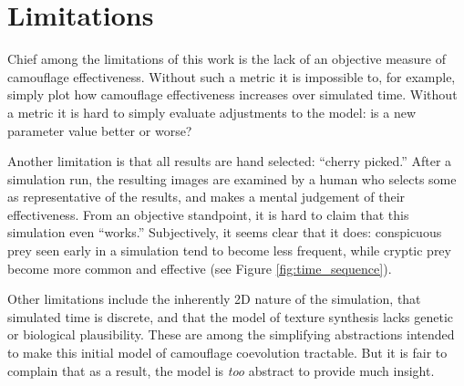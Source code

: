 \documentclass[acmtog]{acmart}
\begin{document}

\section{Limitations}
\label{subsec:limitations}
Chief among the limitations of this work is the lack of an objective measure of camouflage effectiveness. Without such a metric it is impossible to, for example, simply plot how camouflage effectiveness increases over simulated time. Without a metric it is hard to simply evaluate adjustments to the model: is a new parameter value better or worse?
\par
Another limitation is that all results are hand selected: “cherry picked.” After a simulation run, the resulting images are examined by a human who selects some as representative of the results, and makes a mental judgement of their effectiveness. From an objective standpoint, it is hard to claim that this simulation even “works.” Subjectively, it seems clear that it does: conspicuous prey seen early in a simulation tend to become less frequent, while cryptic prey become more common and effective (see Figure \ref{fig:time_sequence}).
\par
Other limitations include the inherently 2D nature of the simulation, that simulated time is discrete, and that the model of texture synthesis lacks genetic or biological plausibility. These are among the simplifying abstractions intended to make this initial model of camouflage coevolution tractable. But it is fair to complain that as a result, the model is \textit{too} abstract to provide much insight.
\par

\end{document}
